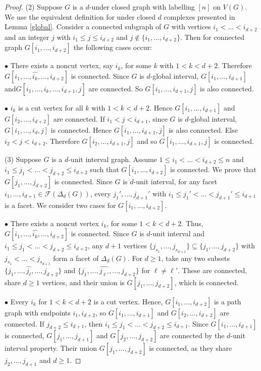 \documentclass[10pt,a4paper]{amsart}
\begin{document}
\begin{proof}
(2) Suppose $G$ is a $d$-under closed graph with labelling $[n]$ on $V(G)$. We use the equivalent definition for under closed $d$ complexes presented in Lemma \ref{global}. Consider a connected subgraph of $G$ with vertices $i_1<\dots < i_{d+2}$ and an integer $j$ with $i_1\leq j\leq i_{d+2}$ and $j\notin \{i_1, \dots , i_{d+2}\}$.  Then for connected graph $G[i_1, \dots , i_{d+2}]$ the following cases occur:

$\bullet$ There exists a noncut vertex, say $i_k$, for some $k$ with $1< k <d+2$.
Therefore $G[i_1, \dots , \widehat{i_k}, \dots , i_{d+2}]$ is connected. Since $G$ is $d$-global interval, $G[i_1, \dots , i_{d+1}]$ and\linebreak $G[i_1, \dots , \widehat{i_k}, \dots , i_{d+1}, j]$ are connected. So $G[i_1, \dots , i_{d+1}, j]$ is also connected.

$\bullet$ $i_k$ is a cut vertex for all $k$ with $1<k < d+2$. Hence $G[i_1, \dots , i_{d+1}]$ and $G[i_2, \dots , i_{d+2}]$ are connected. If $i_1<j<i_{d+1}$,  since $G$ is $d$-global interval, $G[i_1, \dots , i_d, j]$ is connected. Hence  $G[i_1, \dots , i_{d+1}, j]$ is also connected. Else $i_2<j<i_{d+2}$. Therefore $G[i_2, \dots , i_{d+1}, j]$ and so $G[i_1, \dots , i_{d+1},j]$ is connected.

(3) Suppose $G$ is a $d$-unit interval graph. Assume $1 \leq i_1 < \dots < i_{d+2} \leq n$ and $i_1 \leq j_1 < \dots < j_{d+2} \leq i_{d+2}$ such that $G[i_1, \dots, i_{d+2}]$ is connected. We prove that $G[j_1, \dots, j_{d+2}]$ is connected. Since $G$ is $d$-unit interval, for any facet ${i_1, \dots, i_{d+1}} \in \mathcal{F}(\Delta_d(G))$, every ${j_1', \dots, j_{d+1}'}$ with $i_1 \leq j_1' < \dots < j_{d+1}' \leq i_{d+1}$ is a facet. We consider two cases for $G[i_1, \dots, i_{d+2}]$.

$\bullet$ There exists a noncut vertex $i_k$, for some $1 < k < d+2$. Thus, $G[i_1, \dots, \widehat{i_k}, \dots, i_{d+2}]$ is connected. Since $G$ is $d$-unit interval and $i_1 \leq j_1 < \dots < j_{d+2} \leq i_{d+2}$, any $d+1$ vertices $\{j_{s_1}, \dots, j_{s_{d+1}}\} \subseteq \{j_1, \dots, j_{d+2}\}$ with $j_{s_1} < \dots < j_{s_{d+1}}$ form a facet of $\Delta_d(G)$. For $d \geq 1$, take any two subsets $\{j_1, \dots, \widehat{j_\ell}, \dots, j_{d+2}\}$ and $\{j_1, \dots, \widehat{j_{\ell'}}, \dots, j_{d+2}\}$ for $\ell \neq \ell'$. These are connected, share $d \geq 1$ vertices, and their union is $G[j_1, \dots, j_{d+2}]$, which is connected.

$\bullet$ Every $i_k$ for $1 < k < d+2$ is a cut vertex. Hence, $G[i_1, \dots, i_{d+2}]$ is a path graph with endpoints $i_1, i_{d+2}$, so $G[i_1, \dots, i_{d+1}]$ and $G[i_2, \dots, i_{d+2}]$ are connected. If $j_{d+2} \leq i_{d+1}$, then $i_1 \leq j_1 < \dots < j_{d+2} \leq i_{d+1}$. Since $G[i_1, \dots, i_{d+1}]$ is connected, $G[j_1, \dots, j_{d+1}]$  and $G[j_2, \dots, j_{d+2}]$ are connected by the $d$-unit interval property.  Their union $G[j_1, \dots, j_{d+2}]$ is connected, as they share $j_2, \dots, j_{d+1}$ and $d \geq 1$.


\end{proof}
\end{document}

